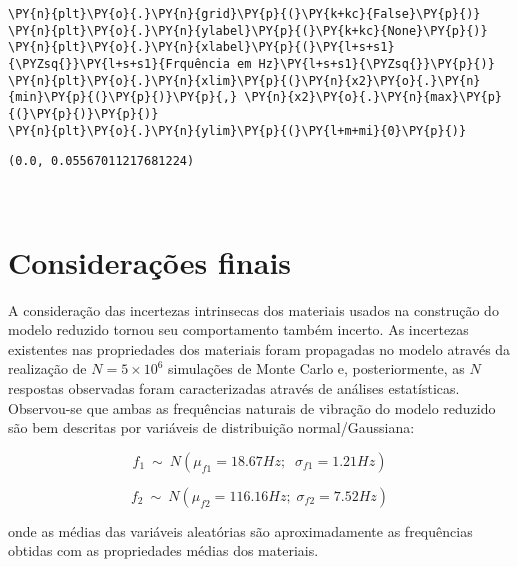 \begin{tcolorbox}[breakable, size=fbox, boxrule=1pt, pad at break*=1mm,colback=cellbackground, colframe=cellborder]
\begin{Verbatim}[commandchars=\\\{\}]
\PY{n}{plt}\PY{o}{.}\PY{n}{grid}\PY{p}{(}\PY{k+kc}{False}\PY{p}{)}
\PY{n}{plt}\PY{o}{.}\PY{n}{ylabel}\PY{p}{(}\PY{k+kc}{None}\PY{p}{)}
\PY{n}{plt}\PY{o}{.}\PY{n}{xlabel}\PY{p}{(}\PY{l+s+s1}{\PYZsq{}}\PY{l+s+s1}{Frquência em Hz}\PY{l+s+s1}{\PYZsq{}}\PY{p}{)}
\PY{n}{plt}\PY{o}{.}\PY{n}{xlim}\PY{p}{(}\PY{n}{x2}\PY{o}{.}\PY{n}{min}\PY{p}{(}\PY{p}{)}\PY{p}{,} \PY{n}{x2}\PY{o}{.}\PY{n}{max}\PY{p}{(}\PY{p}{)}\PY{p}{)}
\PY{n}{plt}\PY{o}{.}\PY{n}{ylim}\PY{p}{(}\PY{l+m+mi}{0}\PY{p}{)}
\end{Verbatim}
\end{tcolorbox}

            \begin{tcolorbox}[breakable, size=fbox, boxrule=.5pt, pad at break*=1mm, opacityfill=0]
\begin{Verbatim}[commandchars=\\\{\}]
(0.0, 0.05567011217681224)
\end{Verbatim}
\end{tcolorbox}
        
    \begin{center}
    \end{center}
    { \hspace*{\fill} \\}
    
    \hypertarget{considerauxe7uxf5es-finais}{%
\section{Considerações finais}\label{considerauxe7uxf5es-finais}}

A consideração das incertezas intrinsecas dos materiais usados na
construção do modelo reduzido tornou seu comportamento também incerto.
As incertezas existentes nas propriedades dos materiais foram propagadas
no modelo através da realização de \(N=5\times10^6\) simulações de Monte
Carlo e, posteriormente, as \(N\) respostas observadas foram
caracterizadas através de análises estatísticas. Observou-se que ambas
as frequências naturais de vibração do modelo reduzido são bem descritas
por variáveis de distribuição normal/Gaussiana:

\[ f_1 ~\sim ~N(\mu_{f1}=18.67 Hz; \;\; \sigma_{f1}=1.21 Hz)\]

\[ f_2 ~\sim ~N(\mu_{f2}=116.16 Hz; \; \sigma_{f2}=7.52 Hz)\]

onde as médias das variáveis aleatórias são aproximadamente as
frequências obtidas com as propriedades médias dos materiais.

